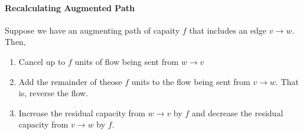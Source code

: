 \paragraph{Recalculating Augmented Path}
Suppose we have an augmenting path of capaity \( f \)
that includes an edge  \( v \to  w \). Then,
\begin{enumerate}
  \item Cancel up to \( f \) units of flow being sent from  \( w \to  v \)
  \item Add the remainder of theose \( f \) units to the flow being sent
    from  \( v \to  w \). That is, reverse the flow.
  \item Increase the residual capacity from \( w \to  v \) by \( f \)
    and decrease the residual capacity from  \( v \to  w \) by \( f \).
\end{enumerate}





